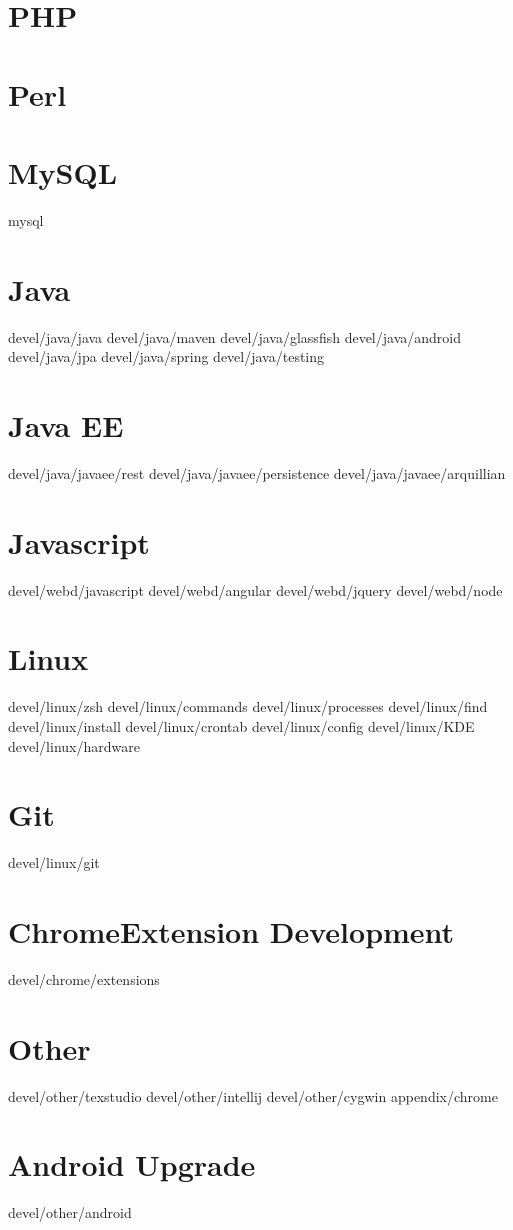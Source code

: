 \documentclass[a4paper]{report}
\begin{document}
\maketitle
\newpage
\tableofcontents
\newpage

%
\chapter{PHP}
\chapter{Perl}
\chapter{MySQL}
 {mysql}
\chapter{Java}
 {devel/java/java}
 {devel/java/maven}
 {devel/java/glassfish}
 {devel/java/android}
 {devel/java/jpa}
 {devel/java/spring}
 {devel/java/testing}
\chapter{Java EE}
 {devel/java/javaee/rest}
 {devel/java/javaee/persistence}
 {devel/java/javaee/arquillian}
\chapter{Javascript}
 {devel/webd/javascript}
 {devel/webd/angular}
 {devel/webd/jquery}
 {devel/webd/node}
\chapter{Linux}
 {devel/linux/zsh}
 {devel/linux/commands}
 {devel/linux/processes}
 {devel/linux/find}
 {devel/linux/install}
 {devel/linux/crontab}
 {devel/linux/config}
 {devel/linux/KDE}
 {devel/linux/hardware}
\chapter{Git}
 {devel/linux/git}
\chapter{ChromeExtension Development}
 {devel/chrome/extensions}
\chapter{Other}
 {devel/other/texstudio}
 {devel/other/intellij}
 {devel/other/cygwin}
\appendix 
 {appendix/chrome}
\chapter{Android Upgrade}
 {devel/other/android}
\end{document}
